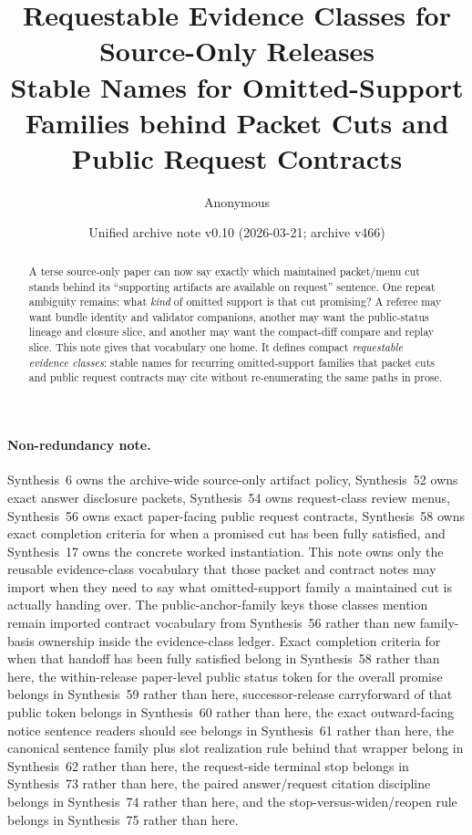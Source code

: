 \documentclass[11pt]{article}
\title{Requestable Evidence Classes for Source-Only Releases\\\large Stable Names for Omitted-Support Families behind Packet Cuts and Public Request Contracts}
\author{Anonymous}
\date{Unified archive note v0.10 (2026-03-21; archive v466)}
\begin{document}
\maketitle

\begin{abstract}
A terse source-only paper can now say exactly which maintained packet/menu cut stands behind its ``supporting artifacts are available on request'' sentence. One repeat ambiguity remains: what \emph{kind} of omitted support is that cut promising? A referee may want bundle identity and validator companions, another may want the public-status lineage and closure slice, and another may want the compact-diff compare and replay slice. This note gives that vocabulary one home. It defines compact \emph{requestable evidence classes}: stable names for recurring omitted-support families that packet cuts and public request contracts may cite without re-enumerating the same paths in prose.
\end{abstract}

\paragraph{Non-redundancy note.}
Synthesis~6 owns the archive-wide source-only artifact policy, Synthesis~52 owns exact answer disclosure packets, Synthesis~54 owns request-class review menus, Synthesis~56 owns exact paper-facing public request contracts, Synthesis~58 owns exact completion criteria for when a promised cut has been fully satisfied, and Synthesis~17 owns the concrete worked instantiation.\cite{series:artifactpolicy,series:challengeanswerdisclosurepackets,series:challengeanswerreviewmenus,series:publicrequestcontracts,series:requestfulfillmentcertificates,series:workedexample}
This note owns only the reusable evidence-class vocabulary that those packet and contract notes may import when they need to say what omitted-support family a maintained cut is actually handing over. The public-anchor-family keys those classes mention remain imported contract vocabulary from Synthesis~56 rather than new family-basis ownership inside the evidence-class ledger. Exact completion criteria for when that handoff has been fully satisfied belong in Synthesis~58 rather than here, the within-release paper-level public status token for the overall promise belongs in Synthesis~59 rather than here, successor-release carryforward of that public token belongs in Synthesis~60 rather than here, the exact outward-facing notice sentence readers should see belongs in Synthesis~61 rather than here, the canonical sentence family plus slot realization rule behind that wrapper belong in Synthesis~62 rather than here, the request-side terminal stop belongs in Synthesis~73 rather than here, the paired answer/request citation discipline belongs in Synthesis~74 rather than here, and the stop-versus-widen/reopen rule belongs in Synthesis~75 rather than here.
\end{document}
